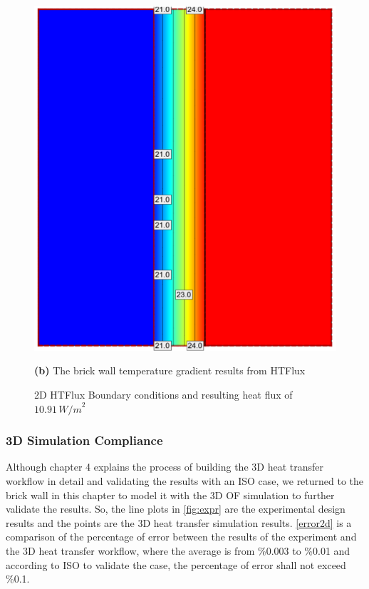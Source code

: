\begin{figure}[H]
\begin{minipage}{0.45\textwidth}
  \includegraphics[width=\linewidth]{Figures/2dsim.png} 
  \caption*{\textbf{(b)} The brick wall temperature gradient results from HTFlux}
\end{minipage}
\caption[2D HTFlux Boundary conditions]{2D HTFlux Boundary conditions and resulting heat flux of \( 10.91 \, {W/m}^2 \)}
\label{2dconst}
\end{figure}


\subsubsection{3D Simulation Compliance}\label{3dbrick}
Although chapter 4 explains the process of building the 3D heat transfer workflow in detail and validating the results with an ISO case, we returned to the brick wall in this chapter to model it with the 3D \gls{OF} simulation to further validate the results. So, the line plots in \ref{fig:expr} are the experimental design results and the points are the 3D heat transfer simulation results. \ref{error2d} is a comparison of the percentage of error between the results of the experiment and the 3D heat transfer workflow, where the average is from \%0.003 to \%0.01 and according to ISO\cite{ISO} to validate the case, the percentage of error shall not exceed \%0.1.

